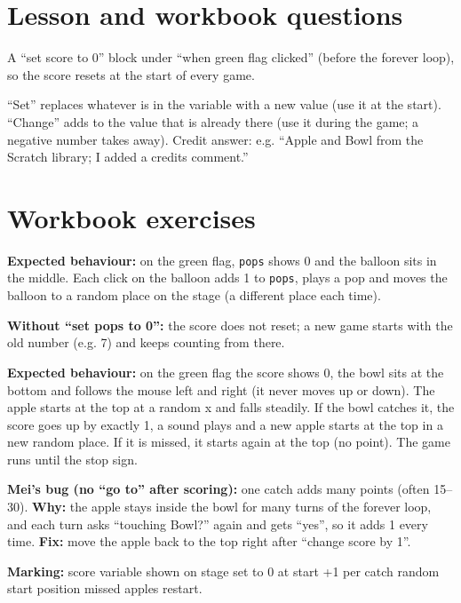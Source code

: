 
\section{Lesson and workbook questions}
\begin{answer}
A \enquote{set score to 0} block under \enquote{when green flag clicked} (before the forever loop), so the score resets at the start of every game.
\end{answer}

\begin{answer}
\enquote{Set} replaces whatever is in the variable with a new value (use it at the start). \enquote{Change} adds to the value that is already there (use it during the game; a negative number takes away). Credit answer: e.g. \enquote{Apple and Bowl from the Scratch library; I added a credits comment.}
\end{answer}

\section{Workbook exercises}
\begin{answer}
\textbf{Expected behaviour:} on the green flag, \texttt{pops} shows 0 and the balloon sits in the middle. Each click on the balloon adds 1 to \texttt{pops}, plays a pop and moves the balloon to a random place on the stage (a different place each time).

\textbf{Without \enquote{set pops to 0}:} the score does not reset; a new game starts with the old number (e.g. 7) and keeps counting from there.
\end{answer}

\begin{answer}
\textbf{Expected behaviour:} on the green flag the score shows 0, the bowl sits at the bottom and follows the mouse left and right (it never moves up or down). The apple starts at the top at a random x and falls steadily. If the bowl catches it, the score goes up by exactly 1, a sound plays and a new apple starts at the top in a new random place. If it is missed, it starts again at the top (no point). The game runs until the stop sign.

\textbf{Mei's bug (no \enquote{go to} after scoring):} one catch adds many points (often 15--30). \textbf{Why:} the apple stays inside the bowl for many turns of the forever loop, and each turn asks \enquote{touching Bowl?} again and gets \enquote{yes}, so it adds 1 every time. \textbf{Fix:} move the apple back to the top right after \enquote{change score by 1}.

\textbf{Marking:} \tickbox{} score variable shown on stage \quad \tickbox{} set to 0 at start \quad \tickbox{} +1 per catch \quad \tickbox{} random start position \quad \tickbox{} missed apples restart.
\end{answer}

